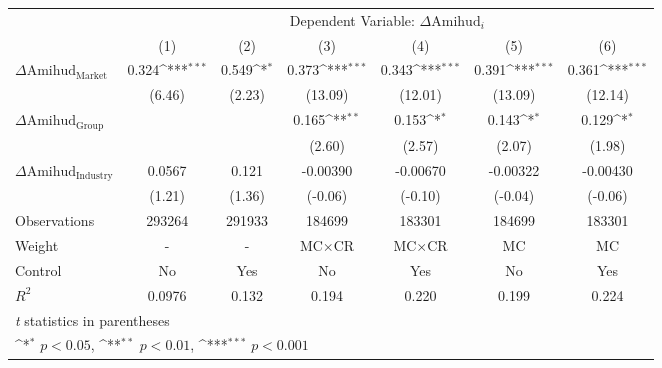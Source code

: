 {
\def\sym#1{\ifmmode^{#1}\else\(^{#1}\)\fi}
\begin{tabular}{l*{6}{c}}
\hline\hline
                    &\multicolumn{6}{c}{Dependent Variable: $\Delta \text{Amihud}_{i} $ }                                                               \\\cmidrule(lr){2-7}
                    &\multicolumn{1}{c}{(1)}         &\multicolumn{1}{c}{(2)}         &\multicolumn{1}{c}{(3)}         &\multicolumn{1}{c}{(4)}         &\multicolumn{1}{c}{(5)}         &\multicolumn{1}{c}{(6)}         \\
\hline
 $ \Delta \text{Amihud}_{\text{Market}} $ &       0.324\sym{***}&       0.549\sym{*}  &       0.373\sym{***}&       0.343\sym{***}&       0.391\sym{***}&       0.361\sym{***}\\
                    &      (6.46)         &      (2.23)         &     (13.09)         &     (12.01)         &     (13.09)         &     (12.14)         \\
[1em]
 $ \Delta \text{Amihud}_{\text{Group}} $ &                     &                     &       0.165\sym{**} &       0.153\sym{*}  &       0.143\sym{*}  &       0.129\sym{*}  \\
                    &                     &                     &      (2.60)         &      (2.57)         &      (2.07)         &      (1.98)         \\
[1em]
 $ \Delta \text{Amihud}_{\text{Industry}} $ &      0.0567         &       0.121         &    -0.00390         &    -0.00670         &    -0.00322         &    -0.00430         \\
                    &      (1.21)         &      (1.36)         &     (-0.06)         &     (-0.10)         &     (-0.04)         &     (-0.06)         \\
\hline
Observations        &      293264         &      291933         &      184699         &      183301         &      184699         &      183301         \\
Weight              &           -         &           -         & $ \text{MC} \times \text{CR} $          & $ \text{MC} \times \text{CR} $          & $ \text{MC} $          & $ \text{MC} $          \\
Control             &          No         &         Yes         &          No         &         Yes         &          No         &         Yes         \\
$ R^2 $             &      0.0976         &       0.132         &       0.194         &       0.220         &       0.199         &       0.224         \\
\hline\hline
\multicolumn{7}{l}{\footnotesize \textit{t} statistics in parentheses}\\
\multicolumn{7}{l}{\footnotesize \sym{*} \(p<0.05\), \sym{**} \(p<0.01\), \sym{***} \(p<0.001\)}\\
\end{tabular}
}
